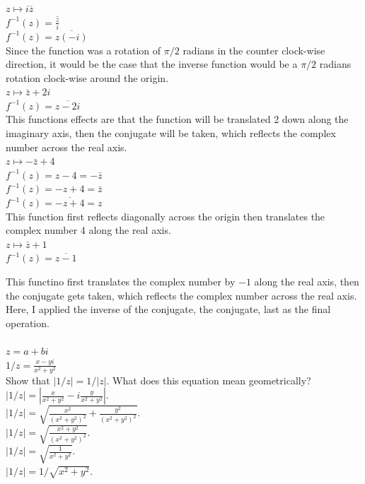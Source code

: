 \documentclass[12pt]{article}
\begin{document}
 $z \mapsto i\overline{z}$\\
$f^{-1}(z) = \overline{\frac{z}{i}}$\\
$f^{-1}(z) = \overline{z(-i)}$\\

Since the function was a rotation of $\pi/2$ radians in the counter clock-wise direction, it would be the case that the inverse function would be a $\pi/2$ radians rotation clock-wise around the origin.\\ 


 $z \mapsto \bar{z} + 2i$\\
$f^{-1}(z) = \overline{z - 2i}$\\

This functions effects are that the function will be translated 2 down along the imaginary axis, then the conjugate will be taken, which reflects the complex number across the real axis.\\

 $z \mapsto -\bar{z} + 4$\\
$f^{-1}(z) = z - 4 = -\bar{z}$\\
$f^{-1}(z) = -z + 4 = \bar{z}$\\
$f^{-1}(z) = \overline{-z + 4} = z$\\

This function first reflects diagonally across the origin then translates the complex number 4 along the real axis.\\


 $z \mapsto \bar{z} + 1$\\
$f^{-1}(z) = \overline{z - 1}$

This functino first translates the complex number by $-1$ along the real axis, then the conjugate gets taken, which reflects the complex number across the real axis.\\ 


Here, I applied the inverse of the conjugate, the conjugate, last as the final operation.\\ 


\\
$z = a + bi$\\
$1/z = \frac{x-yi}{x^2+y^2}$\\

 Show that $|1/z| = 1/|z|$. What does this equation mean geometrically?\\
$|1/z| = |\frac{x}{x^2+y^2} - i\frac{y}{x^2 + y^2}|$.\\
$|1/z| = \sqrt{\frac{x^2}{(x^2 + y^2)^2} + \frac{y^2}{(x^2+y^2)^2}}$.\\
$|1/z| = \sqrt{\frac{x^2+y^2}{(x^2+y^2)^2}}$.\\
$|1/z| = \sqrt{\frac{1}{x^2+y^2}}$.\\
$|1/z| = 1/\sqrt{x^2+y^2}$.\\
\end{document}
